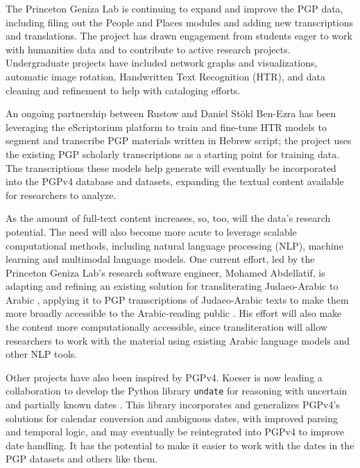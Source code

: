 \documentclass{article}
\begin{document}
The Princeton Geniza Lab is continuing to expand and improve the PGP data, including filing out the People and Places modules and adding new transcriptions and translations. The project has drawn engagement from students eager to work with humanities data and to contribute to active research projects. Undergraduate projects have included network graphs and visualizations, automatic image rotation, Handwritten Text Recognition (HTR), and data cleaning and refinement to help with cataloging efforts. 

An ongoing partnership between Rustow and Daniel Stökl Ben-Ezra \autocite{noauthor_handwritten_nodate} has been leveraging the eScriptorium platform to train and fine-tune HTR models to segment and transcribe PGP materials written in Hebrew script; the project uses the existing PGP scholarly transcriptions as a starting point for training data. The transcriptions these models help generate will eventually be incorporated into the PGPv4 database and datasets, expanding the textual content available for researchers to analyze.

As the amount of full-text content increases, so, too, will the data’s research potential. The need will also become more acute to leverage scalable computational methods, including natural language processing (NLP), machine learning and multimodal language models. One current effort, led by the Princeton Geniza Lab’s research software engineer, Mohamed Abdellatif, is adapting and refining an existing solution for transliterating Judaeo-Arabic to Arabic \autocite{weisberg_mitelman_code-switching_2024}, applying it to PGP transcriptions of Judaeo-Arabic texts to make them more broadly accessible to the Arabic-reading public \autocite{abdellatif_machine_2025}. His effort will also make the content more computationally accessible, since transliteration will allow researchers to work with the material using existing Arabic language models and other NLP tools.

Other projects have also been inspired by PGPv4. Koeser is now leading a collaboration to develop the Python library \texttt{undate} for reasoning with uncertain and partially known dates \autocite{koeser_undate_2024}. This library incorporates and generalizes PGPv4’s solutions for calendar conversion and ambiguous dates, with improved parsing and temporal logic, and may eventually be reintegrated into PGPv4 to improve date handling. It has the potential to make it easier to work with the dates in the PGP datasets and others like them.
\end{document}
